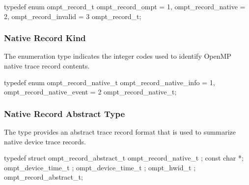 \format
\begin{ccppspecific}
\begin{omptEnum}
typedef enum ompt_record_t {
  ompt_record_ompt               = 1,
  ompt_record_native             = 2,
  ompt_record_invalid            = 3
} ompt_record_t;
\end{omptEnum}
\end{ccppspecific}


\subsubsection{Native Record Kind}
\label{sec:ompt_record_native_t}

\summary
The  enumeration type indicates the integer codes 
used to identify OpenMP native trace record contents.

\format
\begin{ccppspecific}
\begin{omptEnum}
typedef enum ompt_record_native_t {
  ompt_record_native_info  = 1,
  ompt_record_native_event = 2
} ompt_record_native_t;
\end{omptEnum}
\end{ccppspecific}


\subsubsection{Native Record Abstract Type}
\label{sec:ompt_record_abstract_t}

\summary
The  type provides an abstract trace record 
format that is used to summarize native device trace records.

\format
\begin{ccppspecific}
\begin{omptRecord}
typedef struct ompt_record_abstract_t {
  ompt_record_native_t ;
  const char *;
  ompt_device_time_t ;
  ompt_device_time_t ;
  ompt_hwid_t ;
} ompt_record_abstract_t;
\end{omptRecord}
\end{ccppspecific}

\descr

